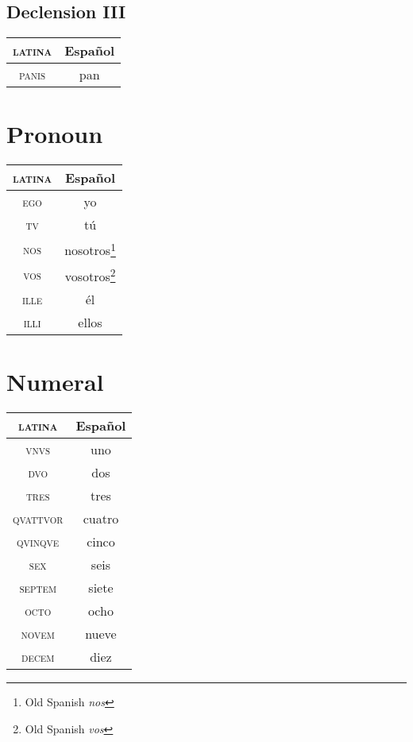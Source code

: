 \documentclass{report}
\begin{document}
\subsection{Declension III}

\begin{tabular}{|c|c|}
  \hline
  \textsc{latina} & Español \\
  \hline
  \textsc{panis} & pan \\
  \hline
\end{tabular}

\section{Pronoun}

\begin{tabular}{|c|c|}
  \hline
  \textsc{latina} & Español \\
  \hline
  \textsc{ego} & yo \\
  \hline
  \textsc{tv} & tú \\
  \hline
  \textsc{nos} & nosotros\footnote{Old Spanish \emph{nos}} \\
  \hline
  \textsc{vos} & vosotros\footnote{Old Spanish \emph{vos}} \\
  \hline
  \textsc{ille} & él \\
  \hline
  \textsc{illi} & ellos \\
  \hline
\end{tabular}

\section{Numeral}

\begin{tabular}{|c|c|}
  \hline
  \textsc{latina} & Español \\
  \hline
  \textsc{vnvs} & uno \\
  \hline
  \textsc{dvo} & dos \\
  \hline
  \textsc{tres} & tres \\
  \hline
  \textsc{qvattvor} & cuatro \\
  \hline
  \textsc{qvinqve} & cinco \\
  \hline
  \textsc{sex} & seis \\
  \hline
  \textsc{septem} & siete \\
  \hline
  \textsc{octo} & ocho \\
  \hline
  \textsc{novem} & nueve \\
  \hline
  \textsc{decem} & diez \\
  \hline
\end{tabular}
\end{document}
